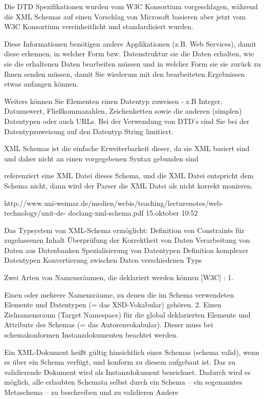 Die DTD Spezifikationen wurden vom W3C Konsortium vorgeschlagen, während die XML Schemas auf einen Vorschlag von Microsoft basieren aber jetzt vom W3C Konsortium vereinheitlicht und standardisiert wurden.

Diese Informationen benötigen andere Applikationen (z.B. Web Services), damit diese erkennen, in welcher Form bzw. Datenstruktur sie die Daten erhalten, wie sie die erhaltenen Daten bearbeiten müssen und in welcher Form sie sie zurück zu Ihnen senden müssen, damit Sie wiederum mit den bearbeiteten Ergebnissen etwas anfangen können.

Weiters können Sie Elementen einen Datentyp zuweisen - z.B Integer, Datumswert, Fließkommazahlen, Zeichenketten sowie die anderen (simplen) Datentypen oder auch URLs. Bei der Verwendung von DTD's sind Sie bei der Datentypzuweisung auf den Datentyp String limitiert.

XML Schemas ist die einfache Erweiterbarkeit dieser, da sie XML basiert sind und daher nicht an einen vorgegebenen Syntax gebunden sind

referenziert eine XML Datei dieses Schema, und die XML Datei entspricht dem Schema nicht, dann wird der Parser die XML Datei als nicht korrekt monieren.


http://www.uni-weimar.de/medien/webis/teaching/lecturenotes/web-technology/unit-de-
doclang-xml-schema.pdf 15.oktober 10:52

Das Typsystem von XML-Schema ermöglicht: 
Definition von Constraints für zugelassenen Inhalt 
Überprüfung der Korrektheit von Daten 
Verarbeitung von Daten aus Datenbanken 
Spezialisierung von Datentypen 
Definition komplexer Datentypen 
Konvertierung zwischen Daten verschiedenen Typs

Zwei Arten von Namensräumen, die deklariert werden können [W3C] : 1.

Einen oder mehrere Namensräume, zu denen die im Schema verwendeten Elemente und Datentypen (= das XSD-Vokabular) gehören. 2. Einen Zielnamensraum (Target Namespace) für die global deklarierten Elemente und Attribute des Schemas (= das Autorenvokabular). Dieser muss bei schemakonformen Instanzdokumenten beachtet werden.

Ein XML-Dokument heißt gültig hinsichtlich eines Schemas (schema valid), wenn es über ein Schema verfügt, und konform zu diesem aufgebaut ist. Das zu validierende Dokument wird als Instanzdokument bezeichnet. Dadurch wird es möglich, alle erlaubten Schemata selbst durch ein Schema – ein sogenanntes Metaschema – zu beschreiben und zu validieren
Andere
